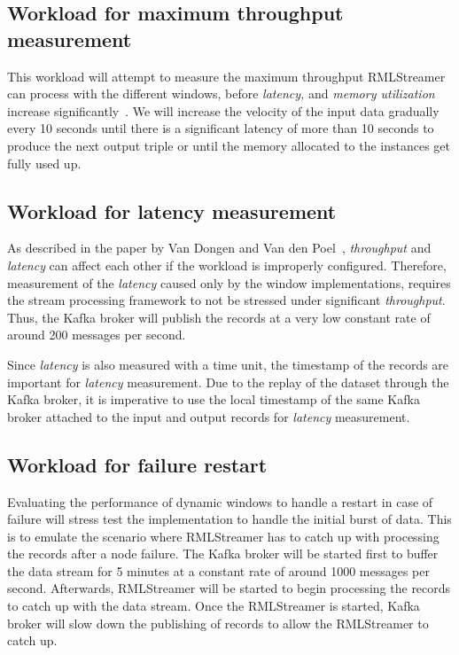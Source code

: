 \subsection{Workload for maximum throughput measurement}
This workload will attempt to measure the maximum throughput RMLStreamer can 
process with the different windows, before \emph{latency,} and \emph{memory utilization}
increase significantly~\cite{benchmark_dsdps}. We will increase the velocity of the input data gradually 
every 10 seconds until there is a significant latency of more than 10 seconds to produce
the next output triple or until the memory allocated to the instances get fully used up. 


\subsection{Workload for latency measurement}
As described in the paper by Van Dongen and Van den Poel~\cite{evalution_of_spe}, 
\emph{throughput} and \emph{latency} can affect each other if the workload is 
improperly configured. Therefore, measurement of the \emph{latency} caused only 
by the window implementations, requires the stream processing framework to not be 
stressed under significant \emph{throughput}. Thus, the Kafka broker will 
publish the records at a very low constant rate of around 200 messages per second. 

Since \emph{latency} is also measured with a time unit, the timestamp of the 
records are important for \emph{latency} measurement. Due to the replay of the dataset 
through the Kafka broker, it is imperative to use the local timestamp of the same Kafka broker
attached to the input and output records for \emph{latency} 
measurement\cite{latency_measurement_kafka}.

\subsection{Workload for failure restart}
Evaluating the performance of dynamic windows to handle a restart in case of failure  
will stress test the implementation to handle the initial burst of data.
This is to emulate the scenario where RMLStreamer has to catch up with processing 
the records after a node failure. The Kafka 
broker will be started first to buffer the data stream for 5 minutes at a constant rate 
of around 1000 messages per second. Afterwards, RMLStreamer will be started to begin 
processing the records to catch up with the data stream. Once the RMLStreamer is started, 
Kafka broker will slow down the publishing of records to allow the RMLStreamer to catch
up.

